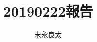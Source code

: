 \documentclass[a4paper]{jsarticle}
\begin{document}
\def\tightlist{\itemsep1pt\parskip0pt\parsep0pt}

\title{\vspace{-3cm}20190222報告}
\author{末永良太}
\maketitle





\end{document}
